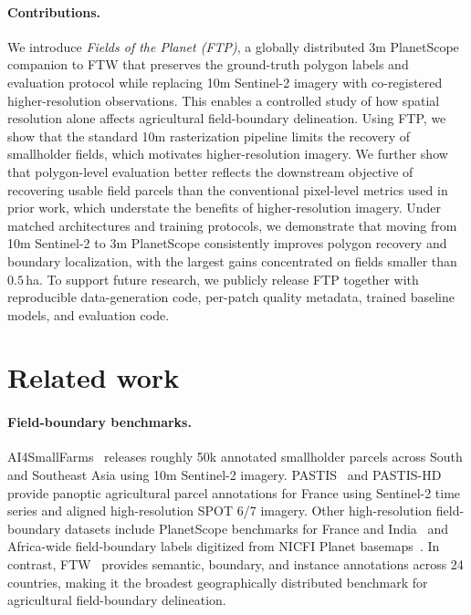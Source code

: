\documentclass[10pt,twocolumn,letterpaper]{article}
\begin{document}
\paragraph{Contributions.}
We introduce \emph{Fields of the Planet (FTP)}, a globally distributed 3m PlanetScope companion to FTW that preserves the ground-truth polygon labels and evaluation protocol while replacing 10m Sentinel-2 imagery with co-registered higher-resolution observations. This enables a controlled study of how spatial resolution alone affects agricultural field-boundary delineation. Using FTP, we show that the standard 10m rasterization pipeline limits the recovery of smallholder fields, which motivates higher-resolution imagery. We further show that polygon-level evaluation better reflects the downstream objective of recovering usable field parcels than the conventional pixel-level metrics used in prior work, which understate the benefits of higher-resolution imagery. Under matched architectures and training protocols, we demonstrate that moving from 10m Sentinel-2 to 3m PlanetScope consistently improves polygon recovery and boundary localization, with the largest gains concentrated on fields smaller than $0.5$\,ha. To support future research, we publicly release FTP together with reproducible data-generation code, per-patch quality metadata, trained baseline models, and evaluation code.

\section{Related work}

\paragraph{Field-boundary benchmarks.}
AI4SmallFarms~\cite{persello2023ai4smallfarms} releases roughly 50k annotated smallholder parcels across South and Southeast Asia using 10m Sentinel-2 imagery. PASTIS~\cite{garnot2021pastis} and PASTIS-HD~\cite{pastishd} provide panoptic agricultural parcel annotations for France using Sentinel-2 time series and aligned high-resolution SPOT 6/7 imagery. Other high-resolution field-boundary datasets include PlanetScope benchmarks for France and India~\cite{wang2022unlocking} and Africa-wide field-boundary labels digitized from NICFI Planet basemaps~\cite{estes2024africa}. In contrast, FTW~\cite{kerner2024ftw} provides semantic, boundary, and instance annotations across 24 countries, making it the broadest geographically distributed benchmark for agricultural field-boundary delineation.
\end{document}
